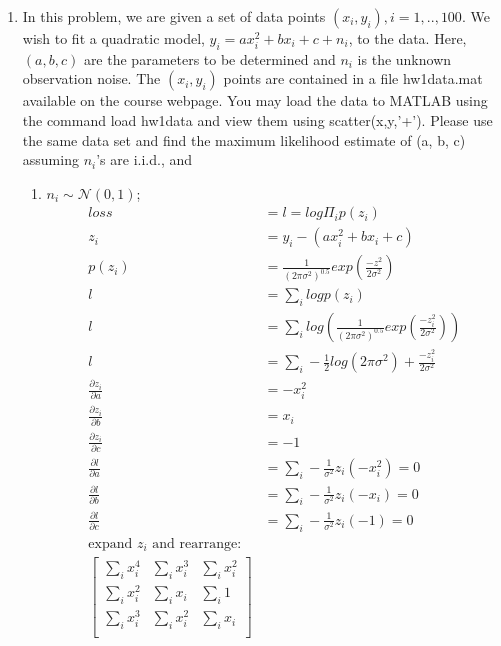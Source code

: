 \documentclass[12pt,letter]{article}
\begin{document}
\begin{enumerate}
\item In this problem, we are given a set of data points $(x_i, y_i ), i=1,..,100$. We wish to fit a quadratic model, $y_i = ax_i^2 + bx_i + c + n_i$, to the data. Here, $(a, b, c)$ are the parameters to be determined and $n_i$ is the unknown observation noise. The $(x_i, y_i)$ points are contained
in a file hw1data.mat available on the course webpage. You may load the data to MATLAB
using the command load hw1data and view them using scatter(x,y,'+'). Please use
the same data set and find the maximum likelihood estimate of (a, b, c) assuming $n_i$'s are
i.i.d., and
\begin{enumerate}
\item $n_i \sim \mathcal{N}(0, 1)$;
  \begin{align*}
    loss &= l = log \Pi_i p(z_i)\\
    z_i &= y_i - (ax_i^2+bx_i+c)\\
    p(z_i) &= \frac{1}{(2 \pi \sigma^2)^{0.5}} exp(\frac{-z^2}{2\sigma^2})\\
    l &= \sum_i log p(z_i)\\
    l &= \sum_i log (\frac{1}{(2 \pi \sigma^2)^{0.5}} exp(\frac{-z_i^2}{2\sigma^2}))\\
    l &= \sum_i -\frac{1}{2} log(2 \pi \sigma^2) + \frac{-z_i^2}{2\sigma^2}\\
    \frac{\partial z_i}{\partial a} &= -x_i^2\\
    \frac{\partial z_i}{\partial b} &= x_i\\
    \frac{\partial z_i}{\partial c} &= -1\\
    \frac{\partial l}{\partial a} &= \sum_i -\frac{1}{\sigma^2}z_i(-x_i^2)=0\\
    \frac{\partial l}{\partial b} &= \sum_i -\frac{1}{\sigma^2}z_i(-x_i)=0\\
    \frac{\partial l}{\partial c} &= \sum_i -\frac{1}{\sigma^2}z_i(-1)=0\\
    \text{expand } z_i \text{ and rearrange: }\\
    \begin{bmatrix}
      \sum_i x_i^4 & \sum_i x_i^3 & \sum_ix_i^2\\
      \sum_i x_i^2 & \sum_i x_i & \sum_i1\\
      \sum_i x_i^3 & \sum_i x_i^2 & \sum_ix_i\\
    \end{bmatrix}

\end{align*}
\end{enumerate}
\end{enumerate}
\end{document}
